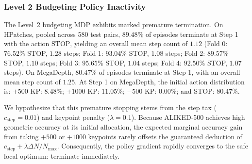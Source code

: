 \documentclass[conference]{IEEEtran}
\begin{document}
\subsubsection{Level 2 Budgeting Policy Inactivity}
The Level~2 budgeting MDP exhibits marked premature termination. On HPatches, pooled across 580 test pairs, $89.48\%$ of episodes terminate at Step 1 with the action $\mathrm{STOP}$, yielding an overall mean step count of $1.12$ (Fold 0: $76.52\%$ STOP, $1.28$ steps; Fold 1: $93.04\%$ STOP, $1.08$ steps; Fold 2: $89.57\%$ STOP, $1.10$ steps; Fold 3: $95.65\%$ STOP, $1.04$ steps; Fold 4: $92.50\%$ STOP, $1.07$ steps). On MegaDepth, $80.47\%$ of episodes terminate at Step 1, with an overall mean step count of $1.25$. At Step 1 on MegaDepth, the initial action distribution is: $+500$ KP: $8.48\%$; $+1000$ KP: $11.05\%$; $-500$ KP: $0.00\%$; and $\mathrm{STOP}$: $80.47\%$.

We hypothesize that this premature stopping stems from the step tax ($c_{\text{step}} = 0.01$) and keypoint penalty ($\lambda = 0.1$). Because ALIKED-500 achieves high geometric accuracy at its initial allocation, the expected marginal accuracy gain from taking $+500$ or $+1000$ keypoints rarely offsets the guaranteed deduction of $c_{\text{step}} + \lambda \Delta N / N_{\max}$. Consequently, the policy gradient rapidly converges to the safe local optimum: terminate immediately.
\end{document}
